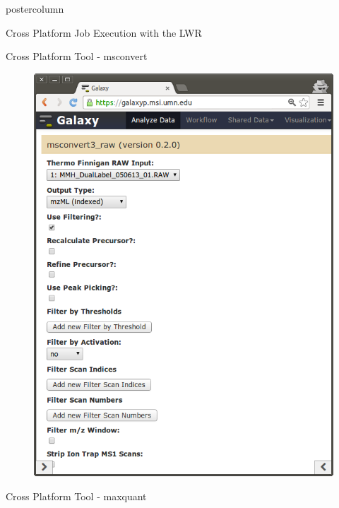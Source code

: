 \documentclass[final]{beamer}
\begin{document}
\begin{frame}
\begin{columns}
\begin{column}{.33\textwidth}
\begin{beamercolorbox}[center,wd=\textwidth]{postercolumn}
\begin{minipage}[T]{.95\textwidth}
{\begin{block}{Cross Platform Job Execution with the LWR}
            \end{block}
            \vfill
            \begin{block}{Cross Platform Tool - msconvert}
              \begin{figure}
                \includegraphics[scale=0.5]{msconvert3_screenshot.png}
              \end{figure}
            \end{block}
            \vfill
            \begin{block}{Cross Platform Tool - maxquant}
              \begin{figure}

\end{figure}
\end{block}}
\end{minipage}
\end{beamercolorbox}
\end{column}
\end{columns}
\end{frame}
\end{document}
